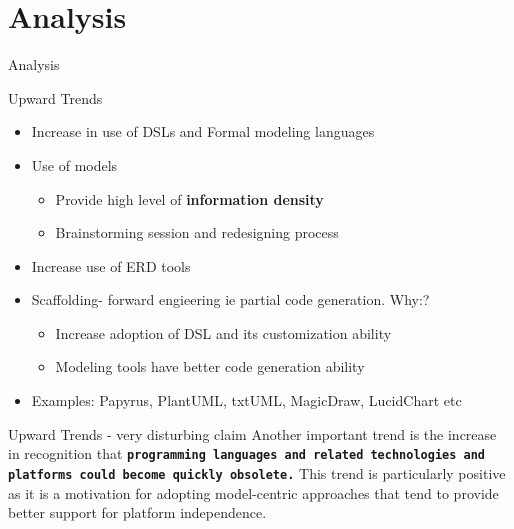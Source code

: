 \documentclass[slidetop,mathserif,red]{beamer}
\begin{document}


\section{Analysis}

\begin{frame}{Analysis}

   \begin{center}
   
   \end{center}
\end{frame}

\begin{frame}{Upward Trends}
    \begin{itemize}
	\item Increase in use of DSLs and Formal modeling languages
	\item Use of models
		\begin{itemize}
			\item Provide high level of \textbf{information density}
			\item Brainstorming session and redesigning process
		\end{itemize}
	\item Increase use of ERD tools
	\item Scaffolding- forward engieering ie partial code generation. Why:? 
	\begin{itemize}
		\item Increase adoption of DSL and its customization ability
		\item Modeling tools have better code generation ability
		
	\end{itemize}
\item Examples: Papyrus, PlantUML, txtUML, MagicDraw, LucidChart etc
\end{itemize}
\end{frame}

\begin{frame}{Upward Trends - very disturbing claim}
Another important trend is the increase in recognition that \textbf{\texttt{programming languages and related technologies and platforms could become quickly obsolete.}} This trend is particularly positive as it is a motivation for adopting model-centric approaches that tend to provide better support for platform independence.
\end{frame}
\end{document}
